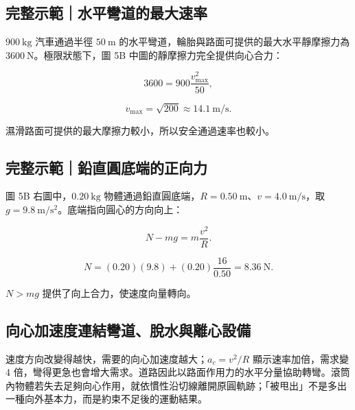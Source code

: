 \documentclass[11pt,a4paper]{article}
\begin{document}
\begin{HandoutWorkedExample}

\subsection{完整示範｜水平彎道的最大速率}\label{ux5b8cux6574ux793aux7bc4ux6c34ux5e73ux5f4eux9053ux7684ux6700ux5927ux901fux7387}

\(900\ \mathrm{kg}\) 汽車通過半徑 \(50\ \mathrm m\) 的水平彎道，輪胎與路面可提供的最大水平靜摩擦力為 \(3600\ \mathrm N\)。極限狀態下，圖 5B 中圖的靜摩擦力完全提供向心合力：

\[
3600=900\frac{v_{\max}^2}{50},
\]

\[
v_{\max}=\sqrt{200}\approx14.1\ \mathrm{m/s}.
\]

濕滑路面可提供的最大摩擦力較小，所以安全通過速率也較小。

\end{HandoutWorkedExample}

\begin{HandoutWorkedExample}

\subsection{完整示範｜鉛直圓底端的正向力}\label{ux5b8cux6574ux793aux7bc4ux925bux76f4ux5713ux5e95ux7aefux7684ux6b63ux5411ux529b}

圖 5B 右圖中，\(0.20\ \mathrm{kg}\) 物體通過鉛直圓底端，\(R=0.50\ \mathrm m\)、\(v=4.0\ \mathrm{m/s}\)，取 \(g=9.8\ \mathrm{m/s^2}\)。底端指向圓心的方向向上：

\[
N-mg=m\frac{v^2}{R}.
\]

\[
N=(0.20)(9.8)+(0.20)\frac{16}{0.50}
=8.36\ \mathrm N.
\]

\(N>mg\) 提供了向上合力，使速度向量轉向。

\end{HandoutWorkedExample}

\subsection{向心加速度連結彎道、脫水與離心設備}\label{ux5411ux5fc3ux52a0ux901fux5ea6ux9023ux7d50ux5f4eux9053ux812bux6c34ux8207ux96e2ux5fc3ux8a2dux5099}

速度方向改變得越快，需要的向心加速度越大；\(a_c=v^2/R\) 顯示速率加倍，需求變 4 倍，彎得更急也會增大需求。道路因此以路面作用力的水平分量協助轉彎。滾筒內物體若失去足夠向心作用，就依慣性沿切線離開原圓軌跡；「被甩出」不是多出一種向外基本力，而是約束不足後的運動結果。
\end{document}
